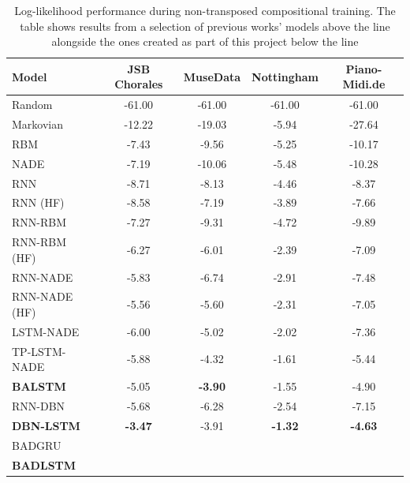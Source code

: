 \documentclass[12pt,]{article}
\begin{document}
\begin{table}[H]
\centering
\caption{Log-likelihood performance during non-transposed compositional training. The table shows results from a selection of previous works’ models above the line alongside the ones created as part of this project below the line}
\vspace{1em}
\begin{tabular}{lcccc} 
\toprule
\textbf{Model}    & \textbf{JSB Chorales} & \textbf{MuseData} & \textbf{Nottingham} & \textbf{Piano-Midi.de}  \\ 
\midrule
Random            & -61.00                & -61.00            & -61.00              & -61.00                  \\
Markovian         & -12.22                & -19.03            & -5.94               & -27.64                  \\
RBM               & -7.43                 & -9.56             & -5.25               & -10.17                  \\
NADE              & -7.19                 & -10.06            & -5.48               & -10.28                  \\
RNN               & -8.71                 & -8.13             & -4.46               & -8.37                   \\
RNN (HF)          & -8.58                 & -7.19             & -3.89               & -7.66                   \\
RNN-RBM           & -7.27                 & -9.31             & -4.72               & -9.89                   \\
RNN-RBM (HF)      & -6.27                 & -6.01             & -2.39               & -7.09                   \\
RNN-NADE          & -5.83                 & -6.74             & -2.91               & -7.48                   \\
RNN-NADE (HF)     & -5.56                 & -5.60             & -2.31               & -7.05                   \\
LSTM-NADE         & -6.00                 & -5.02             & -2.02               & -7.36                   \\
TP-LSTM-NADE      & -5.88                 & -4.32             & -1.61               & -5.44                   \\
\textbf{BALSTM}   & -5.05                 & \textbf{-3.90}    & -1.55               & -4.90                   \\
RNN-DBN           & -5.68                 & -6.28             & -2.54               & -7.15                   \\
\textbf{DBN-LSTM} & \textbf{-3.47}        & -3.91             & \textbf{-1.32}      & \textbf{-4.63}          \\ 
\midrule
BADGRU            &                       &                   &                     &                         \\
\textbf{BADLSTM}  &                       &                   &                     &                         \\
\bottomrule
\end{tabular}
\end{table}
\end{document}
